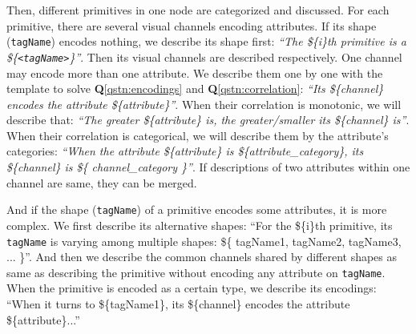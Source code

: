 Then, different primitives in one node are categorized and discussed. 
For each primitive, there are several visual channels encoding attributes.
If its shape (\texttt{tagName}) encodes nothing, we describe its shape first: \textit{``The \$\{i\}th primitive is a \$\{\texttt{<tagName>}\}''}.
Then its visual channels are described respectively.
One channel may encode more than one attribute.
We describe them one by one with the template to solve \textbf{Q}\ref{qstn:encodings} and \textbf{Q}\ref{qstn:correlation}:
\textit{``Its \$\{channel\} encodes the attribute \$\{attribute\}''}.
When their correlation is monotonic, we will describe that:
\textit{``The greater \$\{attribute\} is, the greater/smaller its \$\{channel\} is''}.
When their correlation is categorical, we will describe them by the attribute's categories:
\textit{``When the attribute \$\{attribute\} is \$\{attribute\_category\}, its \$\{channel\} is \$\{ channel\_category \}''}.
If descriptions of two attributes within one channel are same, they can be merged.

And if the shape (\texttt{tagName}) of a primitive encodes some attributes, it is more complex.
We first describe its alternative shapes: 
``For the \$\{i\}th primitive, its \texttt{tagName} is varying among multiple shapes: \$\{ tagName1, tagName2, tagName3, ... \}''.
And then we describe the common channels shared by different shapes as same as describing the primitive without encoding any attribute on \texttt{tagName}.
When the primitive is encoded as a certain type, we describe its encodings: ``When it turns to \$\{tagName1\}, its \$\{channel\} encodes the attribute \$\{attribute\}...''


